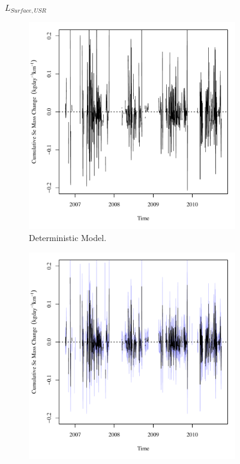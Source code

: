 \begin{linenumbers}
\subfiguretop
\begin{landscape}
	\begin{figure}
		$ \displaystyle L_{Surface,USR} $
		\begin{subfigure}{0.7\textwidth}
			\centering
			\includegraphics[width=\tableCustomSize]{"Figures/Results_USR/Deterministic/Balance Mass - Storage"}
			\caption{Deterministic Model.}
		\end{subfigure}%
		\begin{subfigure}{0.7\textwidth}
			\centering
			\includegraphics[width=\tableCustomSize]{"Figures/Results_USR/Stochastic/Balance Mass - Storage"}

\end{subfigure}
\end{figure}
\end{landscape}
\end{linenumbers}
